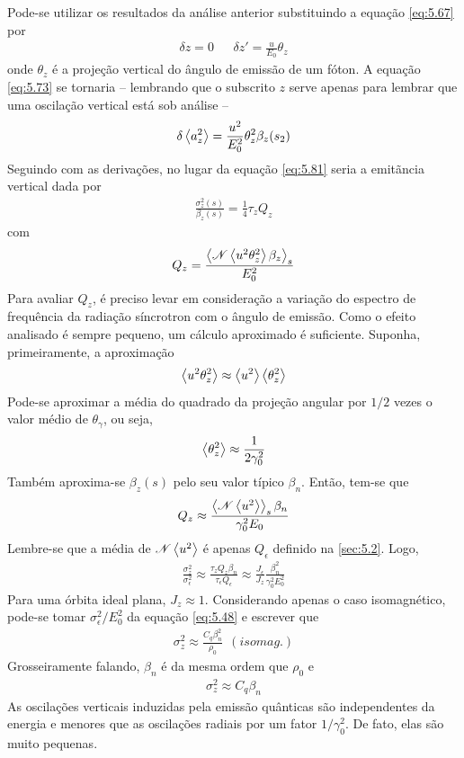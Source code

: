 Pode-se utilizar os resultados da análise anterior substituindo a equação \eqref{eq:5.67} por
\begin{align}
	\delta z = 0\ \ \ \ \ \ \ \delta z' = \frac{u}{E_0}\theta_z
\end{align}
onde $\theta_z$ é a projeção vertical do ângulo de emissão de um fóton. A equação \eqref{eq:5.73} se tornaria -- lembrando que o subscrito $z$ serve apenas para lembrar que uma oscilação vertical está sob análise --
\begin{align}
	\delta \left< a_z^2 \right> = \frac{u^2}{E_0^2} \theta_z^2 \beta_z(s_2)
\end{align}
Seguindo com as derivações, no lugar da equação \eqref{eq:5.81} seria a emitãncia vertical dada por
\begin{align}
	\frac{\sigma_{z}^2(s)}{\beta_z(s)} = \frac{1}{4} \tau_z Q_z
\end{align}
com
\begin{align}
	Q_z = \frac{\left< \mathscr{N}\left< u^2 \theta_z^2 \right>\beta_z \right>_s}{E_0^2}
\end{align}
Para avaliar $Q_z$, é preciso levar em consideração a variação do espectro de frequência da radiação síncrotron com o ângulo de emissão. Como o efeito analisado é sempre pequeno, um cálculo aproximado é suficiente. Suponha, primeiramente, a aproximação
\begin{align}
	\left< u^2 \theta_z^2 \right> \approx \left< u^2 \right>\left< \theta_z^2 \right>
\end{align}
Pode-se aproximar a média do quadrado da projeção angular por $1/2$ vezes o valor médio de $\theta_\gamma$, ou seja,
\begin{align}
	\left< \theta_z^2 \right> \approx \frac{1}{2 \gamma_0^2}
\end{align}
Também aproxima-se $\beta_z(s)$ pelo seu valor típico $\beta_n$. Então, tem-se que
\begin{align}
	Q_z \approx \frac{\left< \mathscr{N}\left< u^2 \right> \right>_s \beta_n}{\gamma_0^2 E_0}
\end{align}
Lembre-se que a média de $\mathscr{N}\left< u^2 \right>$ é apenas $Q_\epsilon$ definido na \autoref{sec:5.2}. Logo,
\begin{align}
	\frac{\sigma_z^2}{\sigma_\epsilon^2} \approx \frac{\tau_z Q_z \beta_n}{\tau_\epsilon Q_\epsilon} \approx \frac{J_\epsilon}{J_z}\frac{\beta_n^2}{\gamma_0^2 E_0^2}
\end{align}
Para uma órbita ideal plana, $J_z \approx 1$. Considerando apenas o caso isomagnético, pode-se tomar $\sigma_\epsilon^2/E_0^2$ da equação \eqref{eq:5.48} e escrever que
\begin{align}
	\sigma_z^2 \approx \frac{C_q \beta_n^2}{\rho_0}\ \ (isomag.)\label{eq:5.107}
\end{align}
Grosseiramente falando, $\beta_n$ é da mesma ordem que $\rho_0$ e
\begin{align}
	\sigma_z^2 \approx C_q \beta_n
\end{align}
As oscilações verticais induzidas pela emissão quânticas são independentes da energia e menores que as oscilações radiais por um fator $1/\gamma_0^2$. De fato, elas são muito pequenas.

